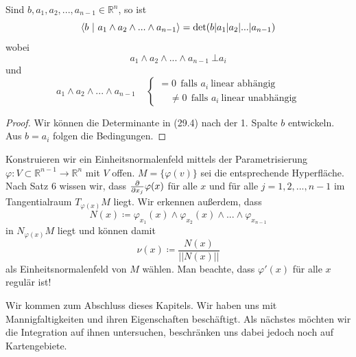 \begin{lemma}
Sind $b, a_1,a_2,...,a_{n-1}\in\mathbb{R}^n$, so ist
\begin{equation}
\left\langle b \ \middle| \ a_1\wedge a_2\wedge...\wedge a_{n-1}\right\rangle=\det (b | a_1|a_2|...|a_{n-1})
\end{equation}
wobei
\begin{equation*}
a_1\wedge a_2\wedge...\wedge a_{n-1} \ \bot a_i
\end{equation*}
und
\begin{equation*}
a_1\wedge a_2\wedge...\wedge a_{n-1} \ \ \ \ \ \left\{\begin{matrix}
=0 \ \ \text{falls\ }a_i\ \text{linear abhängig} \\
\ \ \ \ \ \neq 0 \ \ \text{falls\ }a_i\ \text{linear unabhängig}
\end{matrix}\right.
\end{equation*}
\end{lemma}

\begin{proof}
Wir können die Determinante in (29.4) nach der 1. Spalte $b$ entwickeln. Aus $b=a_i$ folgen die Bedingungen.
\end{proof}

\begin{beispiel}
Konstruieren wir ein Einheitsnormalenfeld mittels der Parametrisierung $\varphi:V\subset\mathbb{R}^{n-1}\rightarrow\mathbb{R}^n$ mit $V$ offen. 
$M=\{\varphi(v)\}$ sei die entsprechende Hyperfläche. Nach Satz 6 wissen wir, dass $\frac{\partial{}}{\partial{x_j}}\varphi(x)$ für alle $x$ und für alle $j=1,2,...,n-1$ im Tangentialraum $T_{\varphi(x)}M$ liegt. Wir erkennen außerdem, dass 
\begin{equation*}
N(x)\coloneqq\varphi_{x_1}(x)\wedge\varphi_{x_2}(x)\wedge ... \wedge\varphi_{x_{n-1}}
\end{equation*}
in $N_{\varphi(x)}M$ liegt und können damit
\begin{equation*}
\nu(x)\coloneqq\frac{N(x)}{||N(x)||}
\end{equation*}
als Einheitsnormalenfeld von $M$ wählen. Man beachte, dass $\varphi'(x)$ für alle $x$ regulär ist!
\end{beispiel}
Wir kommen zum Abschluss dieses Kapitels. Wir haben uns mit Mannigfaltigkeiten und ihren Eigenschaften beschäftigt. Als nächstes möchten wir die Integration auf ihnen untersuchen, beschränken uns dabei jedoch noch auf Kartengebiete.

